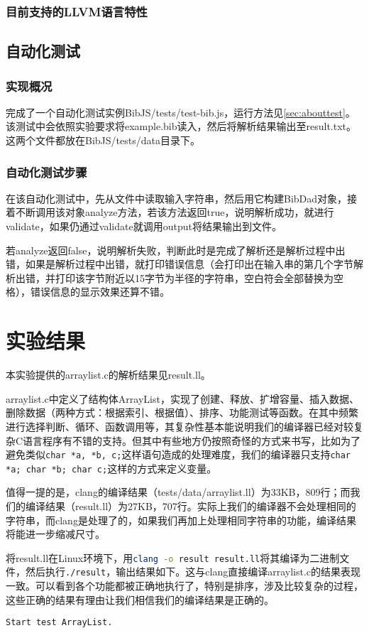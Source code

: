 \documentclass[a4paper]{article}
\begin{document}
\begin{CJK*}{UTF8}{gbsn}
    \subsubsection{目前支持的LLVM语言特性}

    \subsection{自动化测试}
    \subsubsection{实现概况}
    完成了一个自动化测试实例BibJS/tests/test-bib.js，运行方法见\ref{sec:abouttest}。该测试中会依照实验要求将example.bib读入，然后将解析结果输出至result.txt。这两个文件都放在BibJS/tests/data目录下。

    \subsubsection{自动化测试步骤}
    在该自动化测试中，先从文件中读取输入字符串，然后用它构建BibDad对象，接着不断调用该对象analyze方法，若该方法返回true，说明解析成功，就进行validate，如果仍通过validate就调用output将结果输出到文件。
    \par 若analyze返回false，说明解析失败，判断此时是完成了解析还是解析过程中出错，如果是解析过程中出错，就打印错误信息（会打印出在输入串的第几个字节解析出错，并打印该字节附近以15字节为半径的字符串，空白符会全部替换为空格），错误信息的显示效果还算不错。

    \section{实验结果}
    本实验提供的arraylist.c的解析结果见result.ll。
    \par arraylist.c中定义了结构体ArrayList，实现了创建、释放、扩增容量、插入数据、删除数据（两种方式：根据索引、根据值）、排序、功能测试等函数。在其中频繁进行选择判断、循环、函数调用等，其复杂性基本能说明我们的编译器已经对较复杂C语言程序有不错的支持。但其中有些地方仍按照奇怪的方式来书写，比如为了避免类似\lstinline{char *a, *b, c;}这样语句造成的处理难度，我们的编译器只支持\lstinline{char *a; char *b; char c;}这样的方式来定义变量。
    \par 值得一提的是，clang的编译结果（tests/data/arraylist.ll）为33KB，809行；而我们的编译结果（result.ll）为27KB，707行。实际上我们的编译器不会处理相同的字符串，而clang是处理了的，如果我们再加上处理相同字符串的功能，编译结果将能进一步缩减尺寸。
    \par 将result.ll在Linux环境下，用\lstinline[language=sh]{clang -o result result.ll}将其编译为二进制文件，然后执行\lstinline[language=sh]{./result}，输出结果如下。这与clang直接编译arraylist.c的结果表现一致。可以看到各个功能都被正确地执行了，特别是排序，涉及比较复杂的过程，这些正确的结果有理由让我们相信我们的编译结果是正确的。
    \begin{verbatim}
Start test ArrayList.


\end{verbatim}
\end{CJK*}
\end{document}
